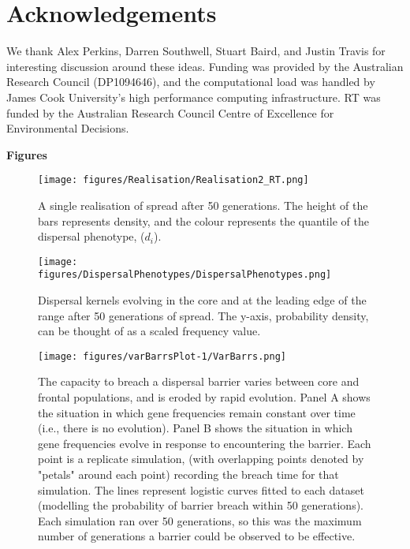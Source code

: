\documentclass{article}
\begin{document}
\section{Acknowledgements}
We thank Alex Perkins, Darren Southwell, Stuart Baird, and Justin Travis for interesting discussion around these ideas.  Funding was provided by the Australian Research Council (DP1094646), and the computational load was handled by James Cook University's high performance computing infrastructure. RT was funded by the Australian Research Council Centre of Excellence for Environmental Decisions.
    
 

 
 
 \newpage
 \bf{Figures}
 \bigskip
 
 \begin{figure}[h!]
\begin{center}
\texttt{[image: figures/Realisation/Realisation2\_RT.png]}
\caption{\label{fig:realisation}
A single realisation of spread after 50 generations.  The height of the bars represents density, and the colour represents the quantile of the dispersal phenotype, ($d_i$).%
}
\end{center}
\end{figure}

\begin{figure}[h!]
\begin{center}
\texttt{[image: figures/DispersalPhenotypes/DispersalPhenotypes.png]}
\caption{\label{fig:kernels}
Dispersal kernels evolving in the core and at the leading edge
of the range after 50 generations of spread.  The y-axis, probability density, can be thought of as a scaled frequency value.
}
\end{center}
\end{figure}

\begin{figure}[h!]
\begin{center}
\texttt{[image: figures/varBarrsPlot-1/VarBarrs.png]}
\caption{\label{fig:varbars}
The capacity to breach a dispersal barrier varies between core
and frontal populations, and is eroded by rapid evolution. Panel A shows the situation in which gene frequencies remain constant over time (i.e., there is no evolution).  Panel B shows the situation in which gene frequencies evolve in response to encountering the barrier.  Each point is a replicate simulation, (with overlapping points denoted by "petals" around each point) recording the breach time for that simulation.  The
lines represent logistic curves fitted to each dataset (modelling the probability of barrier breach within 50 generations). Each
simulation ran over 50 generations, so this was the maximum number of
generations a barrier could be observed to be effective.
}
\end{center}
\end{figure}
\end{document}
